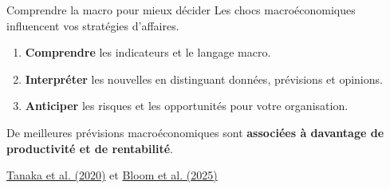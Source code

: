 \documentclass[aspectratio=169]{beamer}
\begin{document}
\begin{frame}{Comprendre la macro pour mieux décider}
   \RaggedRight Les chocs macroéconomiques influencent vos stratégies d’affaires.
   \par\vspace{0.25cm}
   \begin{enumerate}
      \setlength\itemsep{0.20cm}
      \item \textbf{Comprendre} les indicateurs et le langage macro.
      \item \textbf{Interpréter} les nouvelles en distinguant données, prévisions et opinions.
      \item \textbf{Anticiper} les risques et les opportunités pour votre organisation.
   \end{enumerate}
   \vspace{0.20cm}
   \begin{bizimplication}
      \RaggedRight\small De meilleures prévisions macroéconomiques sont \textbf{associées à davantage de productivité et de rentabilité}.
      \par\vspace{4pt}
      {\raggedleft\scriptsize\textcolor{HECgray}{\href{https://www.gsb.stanford.edu/faculty-research/publications/firm-performance-macro-forecast-accuracy}{Tanaka et al. (2020)} et \href{https://researchonline.lse.ac.uk/130291/1/paper_all_WPupdate.pdf}{Bloom et al. (2025)}}\par}
   \end{bizimplication}
\end{frame}
\end{document}

